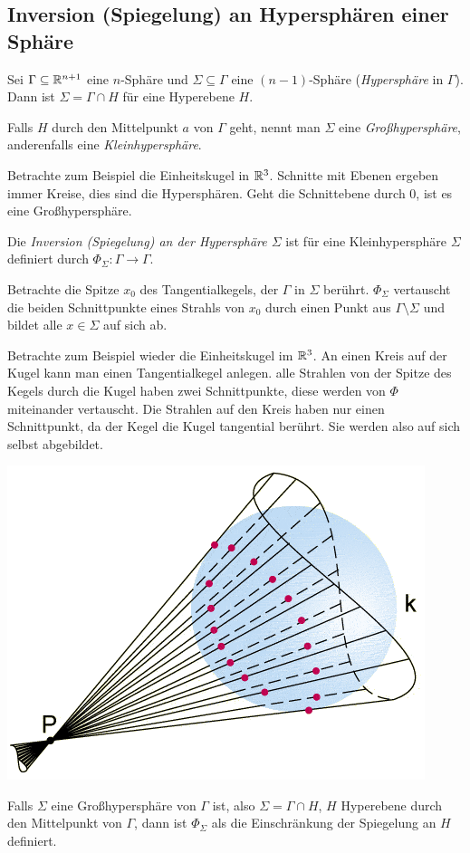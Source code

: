 \subsection{Inversion (Spiegelung) an Hypersphären einer Sphäre}
Sei $\Gamma \subseteq \mathbb{R}^{n+1}$ eine $n$-Sphäre und $\Sigma \subseteq \Gamma$
eine $(n-1)$-Sphäre (\emph{Hypersphäre} in $\Gamma$). Dann ist $\Sigma = \Gamma
\cap H$ für eine Hyperebene $H$.

Falls $H$ durch den Mittelpunkt $a$ von $\Gamma$ geht, nennt man $\Sigma$ eine
\emph{Großhypersphäre}, anderenfalls eine
\emph{Kleinhypersphäre}.

Betrachte zum Beispiel die Einheitskugel in $\mathbb{R}^3$. Schnitte mit Ebenen
ergeben immer Kreise, dies sind die Hypersphären. Geht die Schnittebene durch 0,
ist es eine Großhypersphäre.

\begin{defn*}
 Die \emph{Inversion (Spiegelung) an der Hypersphäre $\Sigma$} ist für eine
 Kleinhypersphäre $\Sigma$ definiert durch $\Phi_\Sigma: \Gamma \to \Gamma$.
 
 Betrachte die Spitze $x_0$ des Tangentialkegels, der $\Gamma$ in $\Sigma$
 berührt. $\Phi_\Sigma$ vertauscht die beiden Schnittpunkte eines Strahls von
 $x_0$ durch einen Punkt aus $\Gamma \setminus \Sigma$ und bildet alle $x \in
 \Sigma$ auf sich ab.

 Betrachte zum Beispiel wieder die Einheitskugel im $\mathbb{R}^3$. An einen Kreis
 auf der Kugel kann man einen Tangentialkegel anlegen. alle Strahlen von der
 Spitze des Kegels durch die Kugel haben zwei Schnittpunkte, diese werden von
 $\Phi$ miteinander vertauscht. Die Strahlen auf den Kreis haben nur einen
 Schnittpunkt, da der Kegel die Kugel tangential berührt. Sie werden also auf
 sich selbst abgebildet.

 \begin{center}
  \includegraphics[width=.5\textwidth]{img/tangentialkegel}
 \end{center}
 
 Falls $\Sigma$ eine Großhypersphäre von $\Gamma$ ist, also $\Sigma = \Gamma \cap H$, $H$ Hyperebene durch den Mittelpunkt von $\Gamma$, dann ist $\Phi_\Sigma$ als die Einschränkung der Spiegelung an $H$ definiert.
\end{defn*}

